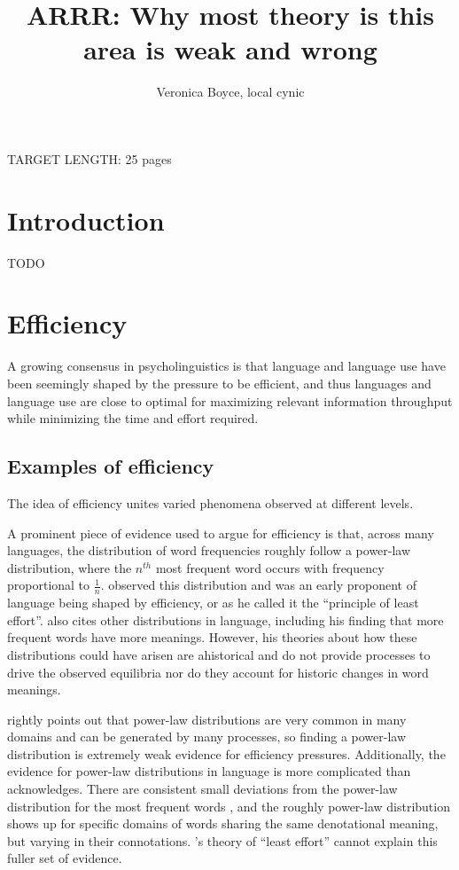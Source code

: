 \documentclass[]{article}
\title{ARRR: Why most theory is this area is weak and wrong}
\author{Veronica Boyce, local cynic}
\begin{document}
\maketitle


	


	
TARGET LENGTH: 25 pages
	

	
\section{Introduction}

TODO
	



\section{Efficiency}

A growing consensus in psycholinguistics is that language and language use have been seemingly shaped by the pressure to be efficient, and thus languages and language use are close to optimal for maximizing relevant information throughput while minimizing the time and effort required. 


\subsection{Examples of efficiency}
The idea of efficiency unites varied phenomena observed at different levels. 

A prominent piece of evidence used to argue for efficiency is that, across many languages, the distribution of word frequencies roughly follow a power-law distribution, where the $n^{th}$ most frequent word occurs with frequency proportional to $\frac{1}{n}$. \cite{zipf1949} observed this distribution and was an early proponent of language being shaped by efficiency, or as he called it the ``principle of least effort''. \cite{zipf1949} also cites other distributions in language, including his finding that more frequent words have more meanings. However, his theories about how these distributions could have arisen are ahistorical and do not provide processes to drive the observed equilibria nor do they account for historic changes in word meanings. 

\cite{piantadosi2014} rightly points out that power-law distributions are very common in many domains and can be generated by many processes, so finding a power-law distribution is extremely weak evidence for efficiency pressures. Additionally, the evidence for power-law distributions in language is more complicated than \cite{zipf1949} acknowledges. There are consistent small deviations from the power-law distribution for the most frequent words \cite{piantadosi2014}, and the roughly power-law distribution shows up for specific domains of words sharing the same denotational meaning, but varying in their connotations. \cite{zipf1949}'s theory of ``least effort'' cannot explain this fuller set of evidence. %
\end{document}
